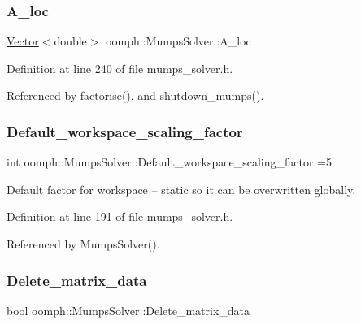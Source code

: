 \subsubsection{\texorpdfstring{A\+\_\+loc}{A\_loc}}
{\footnotesize\ttfamily \hyperlink{classoomph_1_1Vector}{Vector}$<$double$>$ oomph\+::\+Mumps\+Solver\+::\+A\+\_\+loc\hspace{0.3cm}{\ttfamily [private]}}



Definition at line 240 of file mumps\+\_\+solver.\+h.



Referenced by factorise(), and shutdown\+\_\+mumps().

\mbox{\label{classoomph_1_1MumpsSolver_ad6bd1660c9c62b039b9cdd8074169a25}} 
\subsubsection{\texorpdfstring{Default\+\_\+workspace\+\_\+scaling\+\_\+factor}{Default\_workspace\_scaling\_factor}}
{\footnotesize\ttfamily int oomph\+::\+Mumps\+Solver\+::\+Default\+\_\+workspace\+\_\+scaling\+\_\+factor =5\hspace{0.3cm}{\ttfamily [static]}}



Default factor for workspace -- static so it can be overwritten globally. 



Definition at line 191 of file mumps\+\_\+solver.\+h.



Referenced by Mumps\+Solver().

\mbox{\label{classoomph_1_1MumpsSolver_a88430ee69fb2015c48ec123b26e019e9}} 
\subsubsection{\texorpdfstring{Delete\+\_\+matrix\+\_\+data}{Delete\_matrix\_data}}
{\footnotesize\ttfamily bool oomph\+::\+Mumps\+Solver\+::\+Delete\+\_\+matrix\+\_\+data\hspace{0.3cm}{\ttfamily [private]}}



